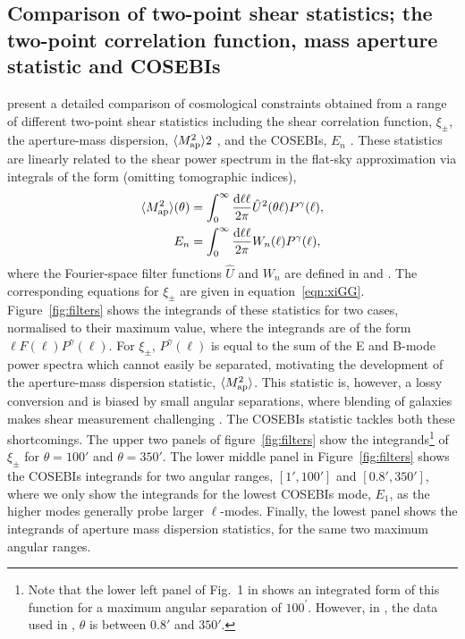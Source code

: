 \subsection{Comparison of two-point shear statistics; the two-point correlation
function, mass aperture statistic and COSEBIs}


\citet{CFHTLenS-2pt-notomo} present a detailed comparison of cosmological
constraints obtained from a range of different two-point shear statistics
including the shear correlation function, $\xi_\pm$, the aperture-mass
dispersion, $\langle M_ {\rm ap}^2 \rangle2$ \citep{1998MNRAS.296..873S}, and
the COSEBIs, $E_n$ \citep{COSEBIs}.  These statistics are linearly related to
the shear power spectrum in the flat-sky approximation via integrals of the form (omitting tomographic indices),
%
\begin{align}
  \langle M_ {\rm ap}^2 \rangle(\theta) & = \int_0^{\infty}\frac{{\rm d} \ell \ell}{2\pi}
  \hat U^2(\theta\ell) P^\gamma(\ell),
  \label{eqn:integ}
  \\
  E_n & = \int_0^{\infty}\frac{{\rm d} \ell \ell}{2\pi} W_n(\ell) P^\gamma(\ell),
\end{align}
%
where the Fourier-space filter functions $\hat U$ and $W_n$ are defined in
\cite{1998MNRAS.296..873S} and \cite{COSEBIs}. The corresponding equations for
$\xi_\pm$ are given in equation~\ref{eqn:xiGG}. Figure~\ref{fig:filters} shows
the integrands of these statistics for two cases, normalised to their maximum
value, where the integrands are of the form $\ell F(\ell) P^\gamma(\ell)$. For
$\xi_\pm$, $P^\gamma(\ell)$ is equal to the sum of the E and B-mode power spectra
which cannot easily be separated,
motivating the development of the aperture-mass dispersion statistic, $\langle
M_ {\rm ap}^2 \rangle$. This statistic is, however, a lossy conversion and is
biased by small angular separations, where blending of galaxies makes shear
measurement challenging \citep{KSE06}. The COSEBIs statistic tackles both
these shortcomings.  The upper two panels of figure~\ref{fig:filters} show the
integrands\footnote{Note that the lower left panel of Fig.~1 in
\citet{2016arXiv161104954K} shows an integrated form of this function for a
maximum angular separation of $100^\prime$. However, in
\citet{CFHTLenS-2pt-notomo}, the data used in \citet{2016arXiv161104954K},
$\theta$ is between $0.8'$ and $350'$.} of $\xi_\pm$ for $\theta=100'$ and
$\theta=350'$. The lower middle panel in Figure~\ref{fig:filters} shows the
COSEBIs integrands for two angular ranges, $[1',100']$ and $[0.8',350']$, where
we only show the integrands for the lowest COSEBIs mode, $E_1$, as the higher
modes generally probe larger $\ell$-modes.  Finally, the lowest panel shows the
integrands of aperture mass dispersion statistics, for the same two maximum
angular ranges. 

